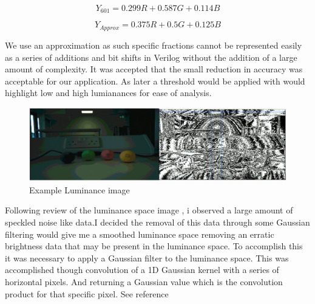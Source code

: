 \documentclass[10pt,twoside]{article}
\begin{document}
\begin{minipage}{.49\textwidth}
\begin{equation}
    Y_{601} = 0.299R + 0.587G + 0.114B
\end{equation}
\end{minipage}
\begin{minipage}{.49\textwidth}
\begin{equation}
    Y_{Approx} = 0.375R + 0.5G + 0.125B
\end{equation}
\end{minipage}

We use an approximation as such specific fractions cannot be represented easily as a series of additions and bit shifts in Verilog  without the addition of a large amount of complexity. It was accepted that the small reduction in accuracy was acceptable for our application. As later a threshold would be applied with would highlight low and high lumianances for ease of analysis.

\begin{figure}[hbt]
\includegraphics[scale = 0.3]{ExampleLuminance.PNG}
\centering
\caption{Example Luminance image }
\label{fig:LuminanceImg}
\end{figure}


Following review of the luminance space image , i observed a large amount of speckled noise like data.I decided the removal of this data through some Gaussian filtering would give me a smoothed luminance space removing an erratic brightness data that may be present in the luminance space. To accomplish this it was necessary to apply a Gaussian filter to the luminance space. This was accomplished though convolution of a 1D Gaussian kernel with a series of horizontal pixels. And returning a Gaussian value which is the convolution product for that specific pixel. See reference \cite{SpatialSmoothing}
\end{document}
